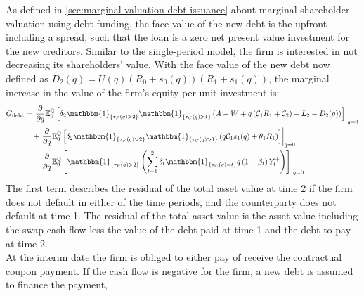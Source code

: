 \documentclass[main.tex]{subfiles}
\begin{document}
        As defined in \cref{sec:marginal-valuation-debt-issuance} about marginal shareholder valuation using debt funding,
        the face value of the new debt is the upfront including a spread, such that the loan is a zero net present value investment for the new creditors.
        Similar to the single-period model, the firm is interested in not decreasing its shareholders' value.
        With the face value of the new debt now defined as $D_{2}(q) = U(q)(R_{0} + s_{0}(q))(R_{1} + s_{1}(q))$,
        the marginal increase in the value of the firm's equity per unit investment is:
        \begin{align}
            G_{\text{debt}} &=
            \left.\frac{\partial}{\partial q}
            \mathbb{E}_{0}^{\rnmeasure}\left[
                \delta_{2} \mathbbm{1}_{\{\tau_{F}(q)>2\}} \mathbbm{1}_{\{\tau_{C}(q)>1\}}
                \left(
                    A - W
                    + q\left(\mathcal{C}_{1} R_{1} + \mathcal{C}_{2}\right)
                    - L_{2}
                    - D_{2}(q)
                \right)
            \right]\right\rvert_{q=0}
            \nonumber
            \\
            &\quad+
            \left.\frac{\partial}{\partial q}
            \mathbb{E}_{0}^{\rnmeasure}\left[
                \delta_2 \mathbbm{1}_{\{\tau_{F}(q)>2\}} \mathbbm{1}_{\{\tau_{C}(q)>1\}}
                \left(q\mathcal{C}_{1} s_1(q) + \theta_{1}R_{1}\right)
            \right]\right\rvert_{q=0}
            \nonumber
            \\
            &\quad-
            \left.\frac{\partial}{\partial q}
            \mathbb{E}_{0}^{\rnmeasure}\left[
                \mathbbm{1}_{\{\tau_{F}(q)>2\}}
                \left(
                    \sum_{t=1}^{2} \delta_{t} \mathbbm{1}_{\{\tau_{C}(q)=t\}}q\left(1-\beta_t\right)Y_{t}^{+}
                \right)
            \right]\right\rvert_{q=0}
        \end{align}
        The first term describes the residual of the total asset value at time 2 if the firm does not default in either of the time periods, and the counterparty does not default at time 1.
        The residual of the total asset value is the asset value including the swap cash flow less the value of the debt paid at time 1 and the debt to pay at time 2.
        \\
        At the interim date the firm is obliged to either pay of receive the contractual coupon payment.
        If the cash flow is negative for the firm, a new debt is assumed to finance the payment,
\end{document}
